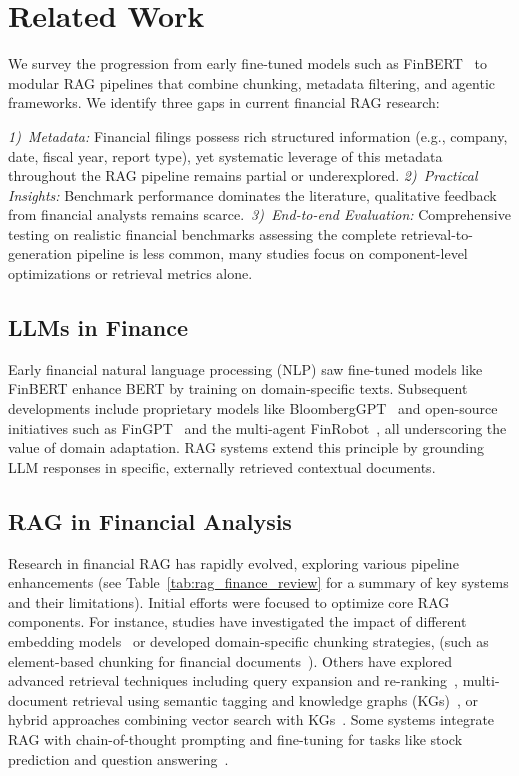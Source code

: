 \documentclass[final,5p,times,twopage,twocolumn,a4paper]{elsarticle}
\begin{document}
    \section{Related Work}
    \label{chap:literature}
    We survey the progression from early fine-tuned models such as FinBERT~\cite{araci2019finbert} to modular RAG pipelines that combine chunking, metadata filtering, and agentic frameworks. We identify three gaps in current financial RAG research:
    
    \textit{1)~Metadata:} Financial filings possess rich structured information (e.g., company, date, fiscal year, report type), yet systematic leverage of this metadata throughout the RAG pipeline remains partial or underexplored. \textit{2)~Practical Insights:} Benchmark performance dominates the literature, qualitative feedback from financial analysts remains scarce.~\textit{3)~End-to-end Evaluation:} Comprehensive testing on realistic financial benchmarks assessing the complete retrieval-to-generation pipeline is less common, many studies focus on component-level optimizations or retrieval metrics alone.

\subsection{LLMs in Finance}
Early financial natural language processing (NLP) saw fine-tuned models like FinBERT enhance BERT by training on domain-specific texts. Subsequent developments include proprietary models like BloombergGPT~\cite{wu2023bloombergGPT} and open-source initiatives such as FinGPT~\cite{liu2023fingpt} and the multi-agent FinRobot~\cite{yang2024finrobot}, all underscoring the value of domain adaptation. RAG systems extend this principle by grounding LLM responses in specific, externally retrieved contextual documents.


\subsection{RAG in Financial Analysis}
Research in financial RAG has rapidly evolved, exploring various pipeline enhancements (see Table~\ref{tab:rag_finance_review} for a summary of key systems and their limitations). Initial efforts were focused to optimize core RAG components. For instance, studies have investigated the impact of different embedding models~\cite{iaroshev2024evaluating} or developed domain-specific chunking strategies, (such as element-based chunking for financial documents~\cite{yepes2024financial}). Others have explored advanced retrieval techniques including query expansion and re-ranking~\cite{setty2024improving,lee2024multireranker}, multi-document retrieval using semantic tagging and knowledge graphs (KGs)~\cite{shah2024multi}, or hybrid approaches combining vector search with KGs~\cite{sarmah2024hybridrag}. Some systems integrate RAG with chain-of-thought prompting and fine-tuning for tasks like stock prediction and question answering~\cite{li2024alphafin}.
\end{document}
